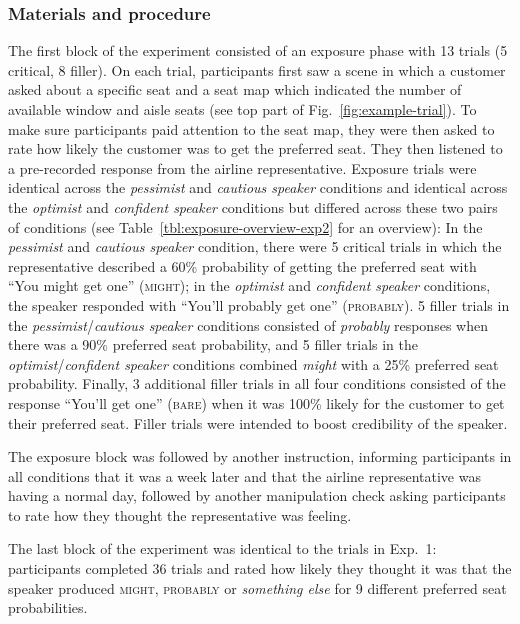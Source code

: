 \subsubsection{Materials and procedure}

The first block of the experiment consisted of an exposure phase with 13 trials (5 critical, 8 filler). On each trial, participants first saw a scene in which a customer asked about a specific seat and a seat map which indicated the number of available window and aisle seats (see top part of Fig.~\ref{fig:example-trial}). To make sure participants paid attention to the seat map, they were then asked to rate how likely the customer  was to get the preferred seat. They then listened to a pre-recorded response from the airline representative. Exposure trials were identical across the \textit{pessimist} and \textit{cautious speaker} conditions and identical across the \textit{optimist} and \textit{confident speaker} conditions but differed across these two pairs of conditions (see Table~\ref{tbl:exposure-overview-exp2} for an overview): In the \textit{pessimist} and \textit{cautious speaker} condition, there were 5 critical trials in which the representative described a 60\% probability of getting the preferred seat with ``You might get one'' (\textsc{might}); in the \textit{optimist} and \textit{confident speaker} conditions, the speaker responded with ``You'll probably get one'' (\textsc{probably}). 5 filler trials in the \textit{pessimist}/\textit{cautious speaker} conditions consisted of \textit{probably} responses   when there was a 90\% preferred seat probability, and 5 filler trials in the \textit{optimist}/\textit{confident speaker} conditions combined \textit{might} with a 25\% preferred seat  probability. Finally, 3 additional filler trials in all four conditions consisted of the response ``You'll get one'' (\textsc{bare}) when it was 100\% likely for the customer to get their preferred seat. Filler trials were intended to boost credibility of the speaker.

The exposure block was followed by another instruction, informing participants in all conditions that it was a week later and that the airline representative was having a normal day, followed by another manipulation check asking participants to rate how they thought the representative was feeling. 

The last block of the experiment was identical to the trials in Exp.~1: participants completed 36 trials and rated how likely they thought it was that the speaker produced \textsc{might}, \textsc{probably} or \textit{something else} for 9 different preferred seat probabilities.

